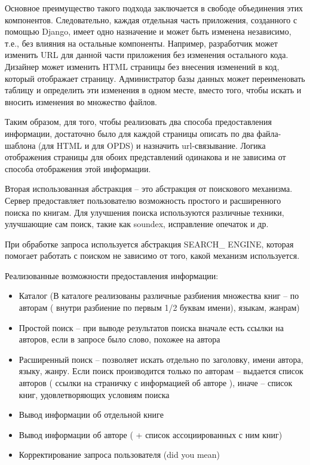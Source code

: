 \documentclass[a4paper]{report}
\begin{document}
Основное преимущество такого подхода заключается в свободе объединения этих компонентов. Следовательно, каждая отдельная часть приложения, созданного с помощью Django, имеет одно назначение и может быть изменена независимо, т.е., без влияния на остальные компоненты. Например, разработчик может изменить URL для данной части приложения без изменения остального кода. Дизайнер может изменить HTML страницы без внесения изменений в код, который отображает страницу. Администратор базы данных может переименовать таблицу и определить эти изменения в одном месте, вместо того, чтобы искать и вносить изменения во множество файлов.

Таким образом, для того, чтобы реализовать два способа предоставления информации, достаточно было для каждой страницы описать по два файла-шаблона (для HTML и для OPDS) и назначить url-связывание. Логика отображения страницы для обоих представлений одинакова и не зависима от способа отображения этой информации. 

Вторая использованная абстракция -- это абстракция от поискового механизма. Сервер предоставляет пользователю возможность простого и расширенного поиска по книгам. Для улучшения поиска используются различные техники, улучшающие сам поиск, такие как soundex, исправление опечаток и др. %

При обработке запроса используется абстракция SEARCH\_ ENGINE, которая помогает работать с поиском не зависимо от того, какой механизм используется.


Реализованные возможности предоставления информации:
\begin{itemize}
	\item Каталог (В каталоге реализованы различные разбиения множества книг -- по авторам ( внутри разбиение по первым 1/2 буквам имени), языкам, жанрам)
	\item Простой поиск -- при выводе результатов поиска вначале есть ссылки на авторов, если в запросе было слово, похожее на автора
	\item Расширенный поиск -- позволяет искать отдельно по заголовку, имени автора, языку, жанру. Если поиск производится только по авторам -- выдается список авторов ( ссылки на страничку с информацией об авторе ), иначе -- список книг, удовлетворяющих условиям поиска
\item Вывод информации об отдельной книге
\item Вывод информации об авторе ( + список ассоциированных с ним книг)
\item Корректирование запроса пользователя (did you mean)
\end{itemize}
\end{document}
